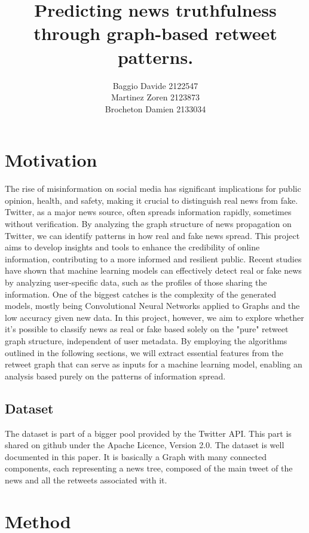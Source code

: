 \documentclass[11pt,a4paper]{article}
\title{Predicting news truthfulness through graph-based retweet patterns.}
\author{Baggio Davide 2122547 \\ Martinez Zoren 2123873 \\ Brocheton Damien 2133034}
\date{}
\begin{document}
\maketitle

\section*{Motivation}

The rise of misinformation on social media has significant implications for public opinion, health, and safety, making it crucial to distinguish real news from fake. Twitter, as a major news source, often spreads information rapidly, sometimes without verification. By analyzing the graph structure of news propagation on Twitter, we can identify patterns in how real and fake news spread. This project aims to develop insights and tools to enhance the credibility of online information, contributing to a more informed and resilient public.
Recent studies\cite{rec_studies} have shown that machine learning models can effectively detect real or fake news by analyzing user-specific data, such as the profiles of those sharing the information. One of the biggest catches is the complexity of the generated models, mostly being Convolutional Neural Networks applied to Graphs and the low accuracy given new data. In this project, however, we aim to explore whether it’s possible to classify news as real or fake based solely on the "pure" retweet graph structure, independent of user metadata. By employing the algorithms outlined in the following sections, we will extract essential features from the retweet graph that can serve as inputs for a machine learning model, enabling an analysis based purely on the patterns of information spread.

\subsection*{Dataset}

The dataset is part of a bigger pool provided by the Twitter API. This part is shared on github under the Apache Licence, Version 2.0\cite{dataset}. The dataset is well documented in this paper\cite{data_paper}. It is basically a Graph with many connected components, each representing a news tree, composed of the main tweet of the news and all the retweets associated with it.

\section*{Method}
\end{document}
